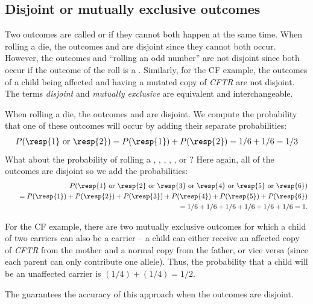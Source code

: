
\subsection{Disjoint or mutually exclusive outcomes}


Two outcomes are called  or  if they cannot both happen at the same time. When rolling a die, the outcomes  and  are disjoint since they cannot both occur.  However, the outcomes  and ``rolling an odd number'' are not disjoint since both occur if the outcome of the roll is a . Similarly, for the CF example, the outcomes of a child being affected and having a mutated copy of \textit{CFTR} are not disjoint. The terms \emph{disjoint} and \emph{mutually exclusive} are equivalent and interchangeable. 

When rolling a die, the outcomes  and  are disjoint. We compute the probability that one of these outcomes will occur by adding their separate probabilities:
\begin{eqnarray*}
P(\text{\resp{1} or \resp{2}}) = P(\text{\resp{1}})+P(\text{\resp{2}}) = 1/6 + 1/6 = 1/3
\end{eqnarray*}
What about  the probability of rolling a , , , , , or ? Here again, all of the outcomes are disjoint so we add the probabilities:
\begin{eqnarray*}
&&P(\text{\resp{1} or \resp{2} or \resp{3} or \resp{4} or \resp{5} or \resp{6}}) \\
	&&\quad= P(\text{\resp{1}})+P(\text{\resp{2}})+P(\text{\resp{3}})+P(\text{\resp{4}})+P(\text{\resp{5}})+P(\text{\resp{6}}) \\
	&&\quad= 1/6 + 1/6 + 1/6 + 1/6 + 1/6 + 1/6 = 1.
\end{eqnarray*}

For the CF example, there are two mutually exclusive outcomes for which a child of two carriers can also be a carrier -- a child can either receive an affected copy of \textit{CFTR} from the mother and a normal copy from the father, or vice versa (since each parent can only contribute one allele). Thus, the probability that a child will be an unaffected carrier is $(1/4) + (1/4) = 1/2$.

The  guarantees the accuracy of this approach when the outcomes are disjoint. 


